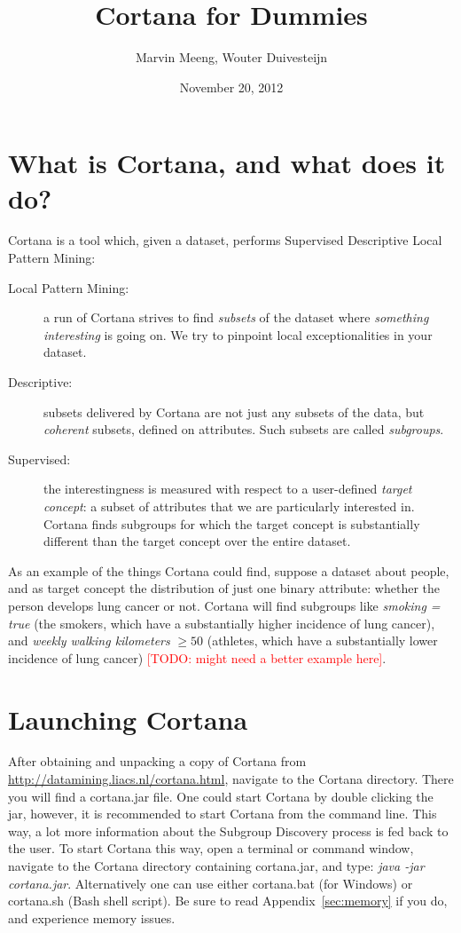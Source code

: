 \documentclass{article}
\title{Cortana for Dummies}
\author{Marvin Meeng, Wouter Duivesteijn}
\date{November 20, 2012}
\newcommand{\todo}[1]{\textcolor{red}{[TODO: #1]}}
\begin{document}
\maketitle

\section{What is Cortana, and what does it do?}

Cortana is a tool which, given a dataset, performs Supervised Descriptive
Local Pattern Mining:
\begin{description}
\item[Local Pattern Mining:] a run of Cortana strives to find \emph{subsets}
of the dataset where \emph{something interesting} is going on. We try to
pinpoint local exceptionalities in your dataset.
\item[Descriptive:] subsets delivered by Cortana are not just any subsets of
the data, but \emph{coherent} subsets, defined on attributes. Such subsets
are called \emph{subgroups}.
\item[Supervised:] the interestingness is measured with respect to a
user-defined \emph{target concept}: a subset of attributes that we are
particularly interested in. Cortana finds subgroups for which the target
concept is substantially different than the target concept over the entire
dataset.
\end{description}
As an example of the things Cortana could find, suppose a dataset about
people, and as target concept the distribution of just one binary attribute:
whether the person develops lung cancer or not. Cortana will find subgroups
like \emph{smoking = true} (the smokers, which have a substantially higher
incidence of lung cancer), and \emph{weekly walking kilometers} $\geq 50$
(athletes, which have a substantially lower incidence of lung cancer)
\todo{might need a better example here}.

\section{Launching Cortana}

After obtaining and unpacking a copy of Cortana from \url{http://datamining.liacs.nl/cortana.html}, navigate to the Cortana directory.
There you will find a cortana.jar file.
One could start Cortana by double clicking the jar, however, it is recommended to start Cortana from the command line.
This way, a lot more information about the Subgroup Discovery process is fed back to the user.
To start Cortana this way, open a terminal or command window, navigate to the Cortana directory containing cortana.jar, and type: \emph{java -jar cortana.jar}.
Alternatively one can use either cortana.bat (for Windows) or cortana.sh (Bash shell script).
Be sure to read Appendix~\ref{sec:memory} if you do, and experience memory issues.
\end{document}
